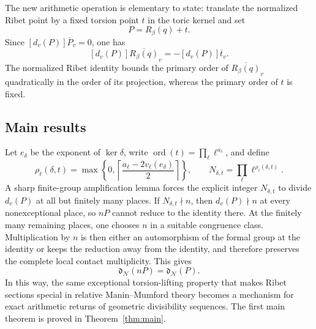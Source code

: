 \documentclass[11pt,letterpaper,reqno]{amsart}
\theoremstyle{definition}
\theoremstyle{remark}
\newcommand{\ord}{\operatorname{ord}}
\begin{document}
The new arithmetic operation is elementary to state: translate the normalized
Ribet point by a fixed torsion point $t$ in the toric kernel and set
\[
 P=R_\beta(q)+t.
\]
Since
\([d_v(P)]\overline P_v=0\), one has
\[
        [d_v(P)]\overline{R_\beta(q)}_v
        =
        -[d_v(P)]\overline t_v.
\]
The normalized Ribet identity bounds the primary order of
\(\overline{R_\beta(q)}_v\) quadratically in the order of its projection,
whereas the primary order of \(t\) is fixed. 

\subsection*{Main results}

Let $e_\delta$ be the exponent of $\ker\delta$, write
$\ord(t)=\prod_\ell\ell^{a_\ell}$, and define
\[
 \rho_\ell(\delta,t)=
 \max\left\{0,
 \left\lceil\frac{a_\ell-2v_\ell(e_\delta)}2\right\rceil\right\},
 \qquad
 N_{\delta,t}=\prod_\ell\ell^{\rho_\ell(\delta,t)}.
\]
A sharp finite-group amplification lemma forces the explicit integer
$N_{\delta,t}$ to divide $d_v(P)$ at all but finitely many places.  If
$N_{\delta,t}\nmid n$, then $d_v(P)\nmid n$ at every nonexceptional place,
so $nP$ cannot reduce to the identity there.  At the finitely many remaining
places, one chooses $n$ in a suitable congruence class.  Multiplication by
$n$ is then either an automorphism of the formal group at the identity or
keeps the reduction away from the identity, and therefore preserves the
complete local contact multiplicity.  This gives
\[
 \mathfrak d_{\mathcal N}(nP)=\mathfrak d_{\mathcal N}(P).
\]
In this way, the same exceptional torsion-lifting property that makes Ribet
sections special in relative Manin--Mumford theory becomes a mechanism for
exact arithmetic returns of geometric divisibility sequences.
The first main theorem is proved in Theorem~\ref{thm:main}.
\end{document}
